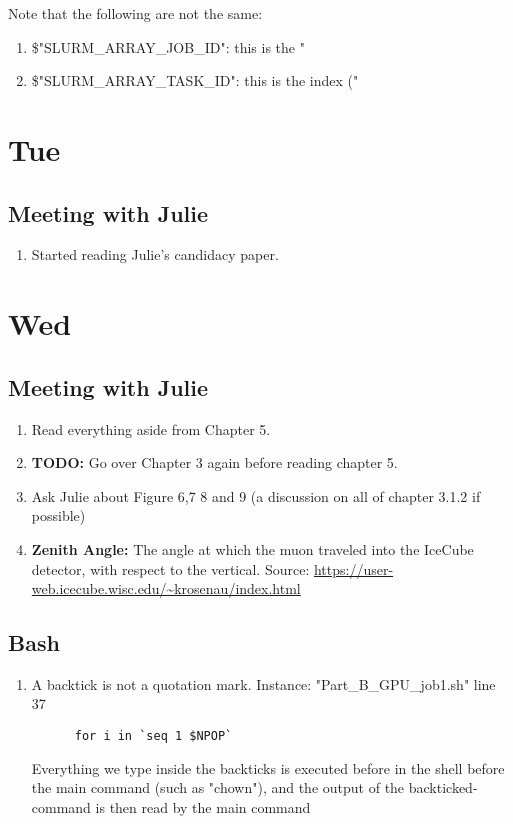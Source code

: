 \documentclass[12pt,letterpaper]{article}
\begin{document}
\noindent Note that the following are not the same:
\begin{enumerate}
  \item \$"SLURM_ARRAY_JOB_ID": this is the "%
  \item \$"SLURM_ARRAY_TASK_ID": this is the index ("%
\end{enumerate}



\section{Tue}
\subsection{Meeting with Julie} 
\begin{enumerate}
  \item Started reading Julie's candidacy paper.
\end{enumerate}

\section{Wed}
\subsection{Meeting with Julie}
\begin{enumerate}
  \item Read everything aside from Chapter 5.
  \item \textbf{TODO:} Go over Chapter 3 again before reading chapter 5.
  \item Ask Julie about Figure 6,7 8 and 9 (a discussion on all of chapter 3.1.2 if
    possible)
  \item \textbf{Zenith Angle:} The angle at which the muon traveled into the
    IceCube detector, with respect to the vertical. Source:
    \url{https://user-web.icecube.wisc.edu/~krosenau/index.html}

\end{enumerate}

\subsection{Bash}
\begin{enumerate}
  \item A backtick is not a quotation mark. Instance: "Part_B_GPU_job1.sh" line 37
    \begin{verbatim}
      for i in `seq 1 $NPOP`
    \end{verbatim}
    Everything we type inside the backticks is executed before in the shell before
    the main command (such as "chown"), and the output of the backticked-command is 
    then read by the main command
    
\end{enumerate}
\end{document}
